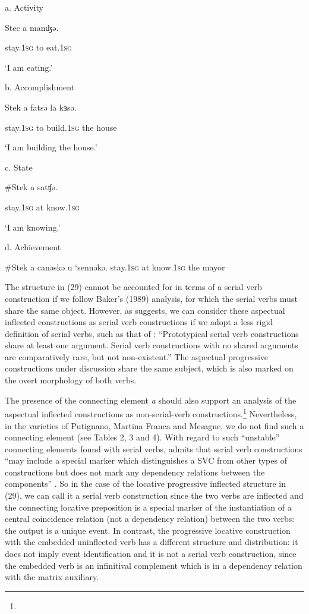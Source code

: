 \documentclass[output=paper]{langsci/langscibook}
\begin{document}
          a.  Activity 

Stec     a  manʤə.

stay.\textsc{1sg} to   eat.\textsc{1sg}   

‘I am eating.’

b.  Accomplishment

Stek     a  fatsə    la  kɜsə.

stay.\textsc{1sg} to   build.\textsc{1sg} the   house

‘I am   building the house.’

c.  State

\#Stek    a  satʧə. 

stay.\textsc{1sg} at  know.\textsc{1sg} 

‘I am knowing.’

d.   Achievement

\#Stek     a  canəskə  u  ‘sennəkə.        stay.\textsc{1sg} at   know.\textsc{1sg} the   mayor 

The structure in (29) cannot be accounted for in terms of a serial verb construction if we follow Baker’s (1989) analysis, for which the serial verbs must share the same object. However, as \citet{Cruschina2013} suggests, we can consider these aspectual inflected constructions as serial verb constructions if we adopt a less rigid definition of serial verbs, such as that of \citet[12]{Aikhenvald2006}: “Prototypical serial verb constructions share at least one argument. Serial verb constructions with no shared arguments are comparatively rare, but not non-existent.” The aspectual progressive constructions under discussion share the same subject, which is also marked on the overt morphology of both verbs. 

The presence of the connecting element \textit{a} should also support an analysis of the aspectual inflected constructions as non-serial-verb constructions.\footnote{} Nevertheless, in the varieties of Putignano, Martina Franca and Mesagne, we do not find such a connecting element (see Tables 2, 3 and 4). With regard to such “unstable” connecting elements found with serial verbs, \citet{Aikhenvald2006} admits that serial verb constructions “may include a special marker which distinguishes a SVC from other types of constructions but does not mark any dependency relations between the components” \citep[20]{Aikhenvald2006}. So in the case of the locative progressive inflected structure in (29), we can call it a serial verb construction since the two verbs are inflected and the connecting locative preposition is a special marker of the instantiation of a central coincidence relation (not a dependency relation) between the two verbs: the output is a unique event. In contrast, the progressive locative construction with the embedded uninflected verb has a different structure and distribution: it does not imply event identification and it is not a serial verb construction, since the embedded verb is an infinitival complement which is in a dependency relation with the matrix auxiliary. 
\end{document}

